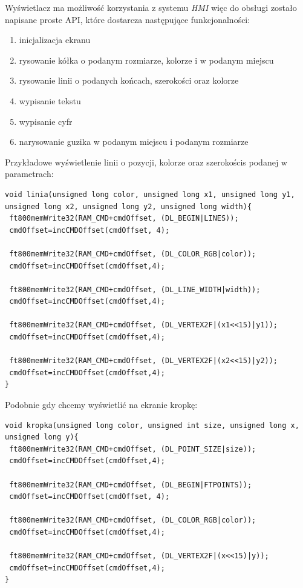 \documentclass{xmgr}
\begin{document}
Wyświetlacz ma możliwość korzystania z systemu \emph{HMI} więc do obsługi zostało napisane proste API, które dostarcza następujące funkcjonalności:
 \begin{enumerate}
	\item inicjalizacja ekranu
	\item rysowanie kółka o podanym rozmiarze, kolorze i w podanym miejscu
	\item rysowanie linii o podanych końcach, szerokości oraz kolorze
	\item wypisanie tekstu
	\item wypisanie cyfr
	\item narysowanie guzika w podanym miejscu i podanym rozmiarze
\end{enumerate}

Przykładowe wyświetlenie linii o pozycji, kolorze oraz szerokościs podanej w parametrach:
\begin{lstlisting}[label=bot-dirs-alg,caption=Narysowanie linii na ekranie]
void linia(unsigned long color, unsigned long x1, unsigned long y1, 
unsigned long x2, unsigned long y2, unsigned long width){
 ft800memWrite32(RAM_CMD+cmdOffset, (DL_BEGIN|LINES));
 cmdOffset=incCMDOffset(cmdOffset, 4);
 
 ft800memWrite32(RAM_CMD+cmdOffset, (DL_COLOR_RGB|color));
 cmdOffset=incCMDOffset(cmdOffset,4);

 ft800memWrite32(RAM_CMD+cmdOffset, (DL_LINE_WIDTH|width));
 cmdOffset=incCMDOffset(cmdOffset,4);

 ft800memWrite32(RAM_CMD+cmdOffset, (DL_VERTEX2F|(x1<<15)|y1));
 cmdOffset=incCMDOffset(cmdOffset,4);
  
 ft800memWrite32(RAM_CMD+cmdOffset, (DL_VERTEX2F|(x2<<15)|y2));
 cmdOffset=incCMDOffset(cmdOffset,4);	
}
\end{lstlisting}

Podobnie gdy chcemy wyświetlić na ekranie kropkę:
\begin{lstlisting}[label=bot-dirs-alg,caption=Narysowanie kropki na ekranie]
void kropka(unsigned long color, unsigned int size, unsigned long x, 
unsigned long y){ 
 ft800memWrite32(RAM_CMD+cmdOffset, (DL_POINT_SIZE|size));
 cmdOffset=incCMDOffset(cmdOffset,4);

 ft800memWrite32(RAM_CMD+cmdOffset, (DL_BEGIN|FTPOINTS));
 cmdOffset=incCMDOffset(cmdOffset, 4);

 ft800memWrite32(RAM_CMD+cmdOffset, (DL_COLOR_RGB|color));
 cmdOffset=incCMDOffset(cmdOffset,4);
 
 ft800memWrite32(RAM_CMD+cmdOffset, (DL_VERTEX2F|(x<<15)|y));
 cmdOffset=incCMDOffset(cmdOffset,4);
}
\end{lstlisting}
\end{document}
